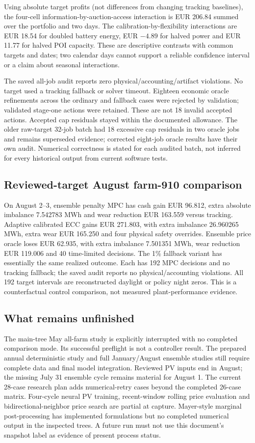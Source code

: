 Using absolute target profits (not differences from changing tracking baselines),
the four-cell information-by-auction-access interaction is EUR 206.84 summed
over the portfolio and two days. The calibration-by-flexibility interactions
are EUR 18.54 for doubled battery energy, EUR $-4.89$ for halved power and
EUR 11.77 for halved POI capacity. These are descriptive contrasts with common
targets and dates; two calendar days cannot support a reliable confidence
interval or a claim about seasonal interactions.

The saved all-job audit reports zero physical/accounting/artifact violations.
No target used a tracking fallback or solver timeout. Eighteen economic oracle
refinements across the ordinary and fallback cases were rejected by validation;
validated stage-one actions were retained. These are not 18 invalid accepted
actions. Accepted cap residuals stayed within the documented allowance. The
older raw-target 32-job batch had 18 excessive cap residuals in two oracle jobs
and remains superseded evidence; corrected eight-job oracle results have their
own audit. Numerical correctness is stated for each audited batch, not inferred
for every historical output from current software tests.

\subsection{Reviewed-target August farm-910 comparison}
On August 2--3, ensemble penalty MPC has cash gain EUR 96.812, extra absolute
imbalance 7.542783 MWh and wear reduction EUR 163.559 versus tracking.
Adaptive calibrated ECC gains EUR 271.803, with extra imbalance 26.960265 MWh,
extra wear EUR 165.250 and four physical safety overrides. Ensemble price oracle
loses EUR 62.935, with extra imbalance 7.501351 MWh, wear reduction EUR 119.006
and 40 time-limited decisions. The 1\% fallback variant has essentially the
same realized outcome. Each has 192 MPC decisions and no tracking fallback;
the saved audit reports no physical/accounting violations. All 192 target
intervals are reconstructed daylight or policy night zeros. This is a
counterfactual control comparison, not measured plant-performance evidence.

\subsection{What remains unfinished}
The main-tree May all-farm study is explicitly interrupted with no completed
comparison mode. Its successful preflight is not a controller result. The
prepared annual deterministic study and full January/August ensemble studies
still require complete data and final model integration. Reviewed PV inputs
end in August; the missing July 31 ensemble cycle remains material for August 1.
The current 28-case research plan adds numerical-retry cases beyond the
completed 26-case matrix. Four-cycle neural PV training, recent-window rolling
price evaluation and bidirectional-neighbor price search are partial at capture.
Mayer-style marginal post-processing has implemented formulations but no
completed numerical output in the inspected trees. A future run must not use
this document's snapshot label as evidence of present process status.

